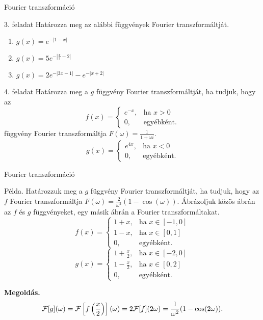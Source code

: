 \documentclass[table]{beamer}
\begin{document}
\begin{frame}
{Fourier transzformáció}
\begin{exampleblock}{3. feladat}
Hat\'arozza meg az al\'abbi f\"uggv\'enyek Fourier transzform\'altj\'at. 
\begin{multicols}{2}
\begin{enumerate}
\item $g(x)=e^{-|1-x|}$ 
\item $g(x)=5e^{-\left\vert \frac x3-2\right\vert }$ 
\item $g(x)=2e^{-|3x-1|}-e^{-|x+2|}$ 
\end{enumerate}
\end{multicols}
\end{exampleblock}



\begin{exampleblock}{4. feladat}
Hat\'arozza meg a $g$ f\"uggv\'eny Fourier transzform\'altj\'at, ha tudjuk, hogy az 
\[
f(x)=\begin{cases}
e^{-x},&\mbox{ha }x>0\\
0,&\mbox{egyébként.}
\end{cases}
\]
f\"uggv\'eny Fourier transzform\'altja $F(\omega )=\frac{1}{1+\omega i}$.
\[
g(x)=\begin{cases}
e^{4x},&\mbox{ha }x<0\\
0,&\mbox{egyébként.}
\end{cases}
\]
\end{exampleblock}
\end{frame}


\begin{frame}[fragile]
{Fourier transzformáció}
\begin{exampleblock}{P\'elda.}
Hat\'arozzuk meg a $g$ f\"uggv\'eny Fourier transzform\'altj\'at, ha tudjuk, hogy az $f$ 
Fourier transzform\'altja $F(\omega )=\frac{2}{\omega^2}(1-\cos(\omega))$. \'Abr\'azoljuk 
k\"oz\"os \'abr\'an az $f$ \'es $g$ f\"uggv\'enyeket, egy m\'asik \'abr\'an a Fourier transzform\'altakat. 
\[
f(x)=\begin{cases}
1+x,&\mbox{ha }x\in[-1,0]\\
1-x,&\mbox{ha }x\in[0,1]\\
0,&\mbox{egyébként.}
\end{cases}
\]
\[
g(x)=\begin{cases}
1+\frac x2,&\mbox{ha }x\in[-2,0]\\
1-\frac x2,&\mbox{ha }x\in[0,2]\\
0,&\mbox{egyébként.}
\end{cases}
\]
\end{exampleblock}
{\bf Megold\'as.}
\[
{\cal F}[g](\omega)={\cal F}\left[ f\left(\frac x2\right)\right](\omega)
=2{\cal F}[f](2\omega)=\frac{1}{\omega ^2}(1-\cos(2\omega)).
\]
\end{frame}
\end{document}
